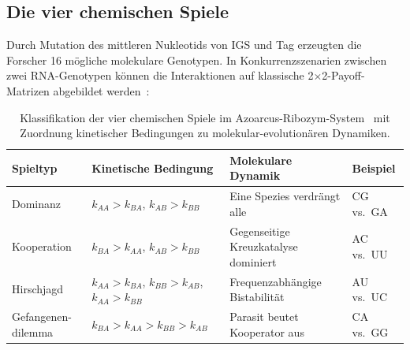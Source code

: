 \documentclass[12pt,a4paper]{article}
\theoremstyle{remark}
\begin{document}
\subsection{Die vier chemischen Spiele}

Durch Mutation des mittleren Nukleotids von IGS und Tag erzeugten die Forscher 16 mögliche molekulare Genotypen. In Konkurrenzszenarien zwischen zwei RNA-Genotypen können die Interaktionen auf klassische 2$\times$2-Payoff-Matrizen abgebildet werden~\citep{AzoarcusPMC}:

\begin{table}[htbp]
\centering
\caption{Klassifikation der vier chemischen Spiele im Azoarcus-Ribozym-System~\citep{AzoarcusPMC} mit Zuordnung kinetischer Bedingungen zu molekular-evolutionären Dynamiken.}
\label{tab:chemical-games}
\setlength{\tabcolsep}{4pt}
\begin{tabularx}{\textwidth}{@{}>{\raggedright\arraybackslash}p{}>{\raggedright\arraybackslash}p{}>{\raggedright\arraybackslash}X>{\raggedright\arraybackslash}p{}@{}}
\toprule
\textbf{Spieltyp} & \textbf{Kinetische Bedingung} & \textbf{Molekulare Dynamik} & \textbf{Beispiel} \\
\midrule
Dominanz & $k_{AA} > k_{BA}$, $k_{AB} > k_{BB}$ & Eine Spezies verdrängt alle & CG vs.\ GA \\
Kooperation & $k_{BA} > k_{AA}$, $k_{AB} > k_{BB}$ & Gegenseitige Kreuzkatalyse dominiert & AC vs.\ UU \\
Hirschjagd & $k_{AA} > k_{BA}$, $k_{BB} > k_{AB}$, $k_{AA} > k_{BB}$ & Frequenzabhängige Bistabilität & AU vs.\ UC \\
Gefangenen-\newline dilemma & $k_{BA} > k_{AA} > k_{BB} > k_{AB}$ & Parasit beutet Kooperator aus & CA vs.\ GG \\
\bottomrule
\end{tabularx}
\end{table}
\end{document}
